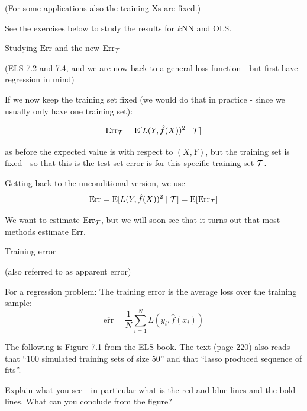\documentclass[
  ignorenonframetext,
]{beamer}
\begin{document}
\begin{frame}

(For some applications also the training Xs are fixed.)

See the exercises below to study the results for \(k\)NN and OLS.

\end{frame}

\begin{frame}

\begin{block}{Studying \(\text{Err}\) and the new
\(\text{Err}_{\cal T}\)}

(ELS 7.2 and 7.4, and we are now back to a general loss function - but
first have regression in mind)

If we now keep the training set fixed (we would do that in practice -
since we usually only have one training set):

\[ \text{Err}_{\cal T}=\text{E}[L(Y,\hat{f}(X))^2\mid {\cal T}]\]

as before the expected value is with respect to \((X,Y)\), but the
training set is fixed - so that this is the test set error is for this
specific training set \({\cal T}\).

Getting back to the unconditional version, we use
\[ \text{Err}=\text{E}[L(Y,\hat{f}(X))^2\mid {\cal T}]=\text{E} [\text{Err}_{\cal T}]\]

We want to estimate \(\text{Err}_{\cal T}\), but we will soon see that
it turns out that most methods estimate \(\text{Err}\).

\end{block}

\end{frame}

\begin{frame}

\begin{block}{Training error}

(also referred to as apparent error)

For a regression problem: The training error is the average loss over
the training sample:
\[\overline{\text{err}}=\frac{1}{N} \sum_{i=1}^N L(y_i,\hat{f}(x_i))\]

The following is Figure 7.1 from the ELS book. The text (page 220) also
reads that ``100 simulated training sets of size 50'' and that ``lasso
produced sequence of fits''.

Explain what you see - in particular what is the red and blue lines and
the bold lines. What can you conclude from the figure?

\end{block}

\end{frame}
\end{document}
